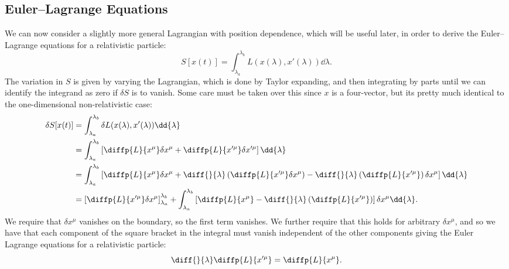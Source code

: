 \documentclass[fleqn]{NotesClass}
\newcommand*{\lagrangian}{L}
\begin{document}
    \subsection{Euler--Lagrange Equations}
    We can now consider a slightly more general Lagrangian with position dependence, which will be useful later, in order to derive the Euler--Lagrange equations for a relativistic particle:
    \begin{equation}
        S[x(t)] = \int_{\lambda_a}^{\lambda_b} \lagrangian(x(\lambda), x'(\lambda)) \dd{\lambda}.
    \end{equation}
    The variation in \(S\) is given by varying the Lagrangian, which is done by Taylor expanding, and then integrating by parts until we can identify the integrand as zero if \(\delta S\) is to vanish.
    Some care must be taken over this since \(x\) is a four-vector, but its pretty much identical to the one-dimensional non-relativistic case:
    \begin{align}
        \delta S[x(t)] &= \int_{\lambda_a}^{\lambda_b} \delta \lagrangian(x(\lambda), x'(\lambda)) \dd{\lambda}\\
        &= \int_{\lambda_a}^{\lambda_b} \left[ \diffp{\lagrangian}{x^\mu}\delta x^\mu + \diffp{\lagrangian}{x'^\mu} \delta x'^\mu \right] \dd{\lambda}\\
        &= \int_{\lambda_a}^{\lambda_b} \left[ \diffp{\lagrangian}{x^\mu} \delta x^\mu + \diff{}{\lambda}\left( \diffp{\lagrangian}{x'^\mu} \delta x^\mu \right) - \diff{}{\lambda}\left( \diffp{\lagrangian}{x'^\mu} \right) \delta x^\mu \right]\dd{\lambda}\\
        &= \left[ \diffp{\lagrangian}{x'^\mu} \delta x^\mu \right]_{\lambda_a}^{\lambda_b} + \int_{\lambda_a}^{\lambda_b} \left[ \diffp{\lagrangian}{x^\mu} - \diff{}{\lambda}\left( \diffp{\lagrangian}{x'^\mu} \right) \right] \delta x^\mu \dd{\lambda}.
    \end{align}
    We require that \(\delta x^\mu\) vanishes on the boundary, so the first term vanishes.
    We further require that this holds for arbitrary \(\delta x^\mu\), and so we have that each component of the square bracket in the integral must vanish independent of the other components giving the Euler Lagrange equations for a relativistic particle:
    \begin{equation}
        \diff{}{\lambda}\diffp{\lagrangian}{x'^\mu} = \diffp{\lagrangian}{x^\mu}.
    \end{equation}
    
\end{document}
